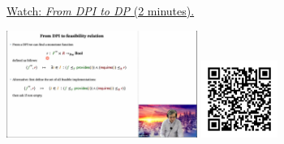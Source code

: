 
\begin{minipage}{10cm}
    \href{https://act4e-spring21.netlify.app/videos/spring2021-design:design:from-dpi-to-dp.html}{Watch: \emph{From DPI to DP} (2 minutes).}
        
    \href{https://act4e-spring21.netlify.app/videos/spring2021-design:design:from-dpi-to-dp.html}{\includegraphics[height=3.5cm]{spring2021-design:design:from-dpi-to-dp/thumbnails.jpg}}
    \href{https://act4e-spring21.netlify.app/videos/spring2021-design:design:from-dpi-to-dp.html}{\includegraphics[height=2.5cm]{spring2021-design:design:from-dpi-to-dp/qrcode.png}}
\end{minipage}
